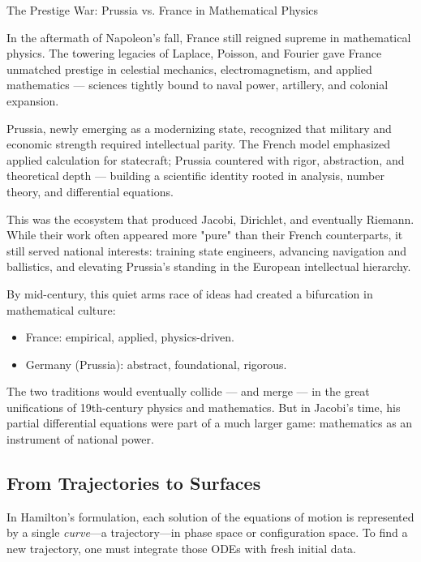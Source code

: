 \begin{HistoricalSidebar}{The Prestige War: Prussia vs. France in Mathematical Physics}

In the aftermath of Napoleon’s fall, France still reigned supreme in mathematical physics. The towering 
legacies of Laplace, Poisson, and Fourier gave France unmatched prestige in celestial mechanics, 
electromagnetism, and applied mathematics — sciences tightly bound to naval power, artillery, and 
colonial expansion.

\medskip

Prussia, newly emerging as a modernizing state, recognized that military and economic strength 
required intellectual parity. The French model emphasized applied calculation for statecraft; 
Prussia countered with rigor, abstraction, and theoretical depth — building a scientific identity 
rooted in analysis, number theory, and differential equations.

\medskip

This was the ecosystem that produced Jacobi, Dirichlet, and eventually Riemann. While their work 
often appeared more "pure" than their French counterparts, it still served national interests: 
training state engineers, advancing navigation and ballistics, and elevating Prussia's standing 
in the European intellectual hierarchy.

\medskip

By mid-century, this quiet arms race of ideas had created a bifurcation in mathematical culture:

\medskip

\begin{itemize}
  \item France: empirical, applied, physics-driven.
  \item Germany (Prussia): abstract, foundational, rigorous.
\end{itemize}

\medskip

The two traditions would eventually collide — and merge — in the great unifications of 19th-century physics and mathematics. But in Jacobi’s time, his partial differential equations were part of a much larger game: mathematics as an instrument of national power.

\subsection{From Trajectories to Surfaces}

In Hamilton’s formulation, each solution of the equations of motion is represented by a single \emph{curve}—a trajectory—in phase space or configuration space.  To find a new trajectory, one must integrate those ODEs with fresh initial data.


\end{HistoricalSidebar}
